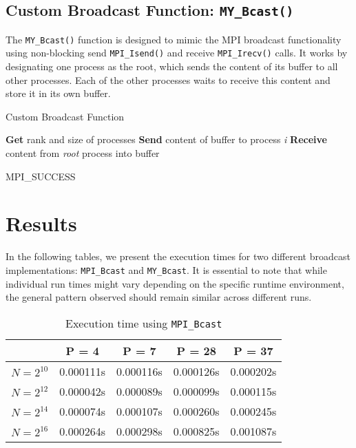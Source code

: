 \documentclass[12pt,a4paper]{article}
\begin{document}
\subsection{Custom Broadcast Function: \texttt{MY\_Bcast()}}
The \texttt{MY\_Bcast()} function is designed to mimic the MPI broadcast functionality using non-blocking send \texttt{MPI_Isend()} and receive \texttt{MPI_Irecv()} calls. 
It works by designating one process as the root, which sends the content of its buffer to all other processes. 
Each of the other processes waits to receive this content and store it in its own buffer.
\begin{algorithm}
    \caption{Custom Broadcast Function}
    \begin{algorithmic}[1]
    \State \textbf{Get} rank and size of processes
                \State \textbf{Send} content of buffer to process \textit{i}
            \EndFor
        \Else
            \State \textbf{Receive} content from \textit{root} process into buffer
        \EndIf
        
        \State \Return MPI\_SUCCESS
    \EndProcedure
    \end{algorithmic}
\end{algorithm}


\section{Results}

In the following tables, 
we present the execution times for two different broadcast implementations: 
\texttt{MPI\_Bcast} and \texttt{MY\_Bcast}. 
It is essential to note that while individual run times might vary depending on the specific runtime environment, 
the general pattern observed should remain similar across different runs.

\begin{table}[!htb]
    \centering
    \begin{tabular}{|c|c|c|c|c|}
    \hline
     & P = 4 & P = 7 & P = 28 & P = 37 \\ 
    \hline
    $N = 2^{10}$ & 0.000111s & 0.000116s & 0.000126s & 0.000202s \\ 
    \hline
    $N = 2^{12}$ & 0.000042s & 0.000089s & 0.000099s & 0.000115s \\ 
    \hline
    $N = 2^{14}$ & 0.000074s & 0.000107s & 0.000260s & 0.000245s \\ 
    \hline
    $N = 2^{16}$ & 0.000264s & 0.000298s & 0.000825s & 0.001087s \\ 
    \hline
    \end{tabular}
    \caption{Execution time using \texttt{MPI\_Bcast}}
\end{table}
\end{document}
